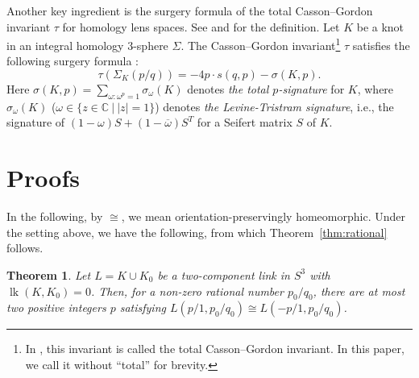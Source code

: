 \documentclass{amsart}
\newtheorem{theorem}{Theorem}
\theoremstyle{remark}
\newcommand{\lk}{\mathop{\mathrm{lk}}\nolimits}
\begin{document}
Another key ingredient is the surgery formula of the total Casson--Gordon invariant $\tau$ for homology lens spaces. 
See \cite[Definition 2.20]{BoyerLines} and \cite{CassonGordon} for the definition. 
Let $K$ be a knot in an integral homology 3-sphere $\Sigma$. 
The Casson--Gordon invariant\footnote{In \cite{BoyerLines}, this invariant is called the total Casson--Gordon invariant. In this paper, we call it without ``total'' for brevity.} $\tau$ satisfies the following surgery formula \cite[Lemma 2.22]{BoyerLines}: 
\begin{equation}\label{CGformula}
\tau(\Sigma_{K}(p/ q)) = -4p \cdot s(q,p) - \sigma(K,p).
\end{equation}
Here $\sigma(K,p)= \sum_{\omega: \omega^{p}=1}\sigma_{\omega}(K)$ denotes \textit{the total $p$-signature} for $K$, where $\sigma_{\omega}(K)$ ($\omega \in \{z \in \mathbb{C}\: | \: |z|=1 \}$) denotes \textit{the Levine-Tristram signature}, i.e., the signature of $(1-\omega)S + (1-\overline{\omega})S^{T}$ for a Seifert matrix $S$ of $K$. 


\section{Proofs}

In the following, by $\cong$, we mean orientation-preservingly homeomorphic. 
Under the setting above, we have the following, from which Theorem~\ref{thm:rational} follows. 

\begin{theorem}\label{thm3}
    Let $L=K \cup K_0$ be a two-component link in $S^3$ with $\lk (K,K_0) = 0$. 
    Then, for a non-zero rational number $p_0 / q_0$, there are at most two positive integers $p$ satisfying $L(p/1,p_0 / q_0) \cong L(-p/1, p_0 / q_0)$. 
\end{theorem}
\end{document}
